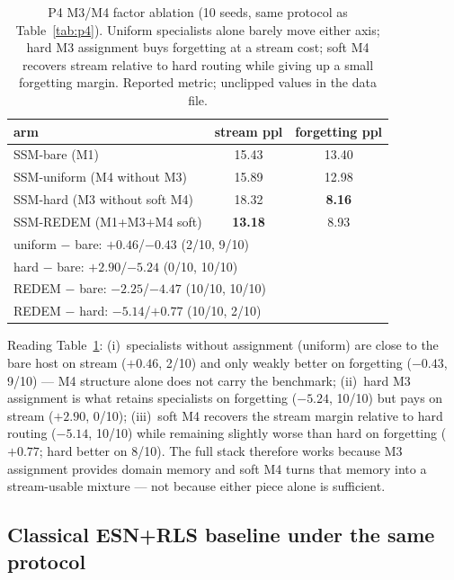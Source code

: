 \documentclass[preprint,12pt]{elsarticle}
\begin{document}
\begin{table}[t]
\centering
\small
\begin{tabular}{lcc}
\toprule
arm & stream ppl & forgetting ppl \\
\midrule
SSM-bare (M1) & 15.43 & 13.40 \\
SSM-uniform (M4 without M3) & 15.89 & 12.98 \\
SSM-hard (M3 without soft M4) & 18.32 & \textbf{8.16} \\
SSM-REDEM (M1+M3+M4 soft) & \textbf{13.18} & 8.93 \\
\midrule
\multicolumn{3}{l}{\scriptsize uniform $-$ bare: $+0.46$/$-0.43$ (2/10, 9/10)} \\
\multicolumn{3}{l}{\scriptsize hard $-$ bare: $+2.90$/$-5.24$ (0/10, 10/10)} \\
\multicolumn{3}{l}{\scriptsize REDEM $-$ bare: $-2.25$/$-4.47$ (10/10, 10/10)} \\
\multicolumn{3}{l}{\scriptsize REDEM $-$ hard: $-5.14$/$+0.77$ (10/10, 2/10)} \\
\bottomrule
\end{tabular}
\caption{P4 M3/M4 factor ablation (10 seeds, same protocol as
Table~\ref{tab:p4}). Uniform specialists alone barely move either axis;
hard M3 assignment buys forgetting at a stream cost; soft M4 recovers
stream relative to hard routing while giving up a small forgetting
margin. Reported metric; unclipped values in the data file.}
\label{tab:m3m4}
\end{table}

Reading Table~\ref{tab:m3m4}: (i)~specialists without assignment
(uniform) are close to the bare host on stream ($+0.46$, 2/10) and only
weakly better on forgetting ($-0.43$, 9/10) --- M4 structure alone does
not carry the benchmark; (ii)~hard M3 assignment is what retains
specialists on forgetting ($-5.24$, 10/10) but pays on stream ($+2.90$,
0/10); (iii)~soft M4 recovers the stream margin relative to hard
routing ($-5.14$, 10/10) while remaining slightly worse than hard on
forgetting ($+0.77$; hard better on 8/10). The full stack therefore
works because M3 assignment provides domain memory and soft M4 turns
that memory into a stream-usable mixture --- not because either piece
alone is sufficient.

\subsection{Classical ESN+RLS baseline under the same protocol}
\label{sec:esn}
\end{document}
